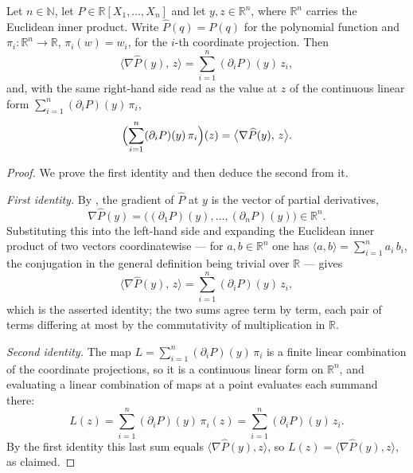 \begin{lemma}
Let $n\in\mathbb{N}$, let $P\in\mathbb{R}[X_1,\dots,X_n]$ and let
$y,z\in\mathbb{R}^n$, where $\mathbb{R}^n$ carries the Euclidean inner product.
Write $\widehat{P}(q)=P(q)$ for the polynomial function and $\pi_i\colon
\mathbb{R}^n\to\mathbb{R}$, $\pi_i(w)=w_i$, for the $i$-th coordinate
projection. Then
\[
  \bigl\langle\nabla\widehat{P}(y),\,z\bigr\rangle
    =\sum_{i=1}^{n}(\partial_iP)(y)\,z_i ,
\]
and, with the same right-hand side read as the value at $z$ of the continuous
linear form $\sum_{i=1}^{n}(\partial_iP)(y)\,\pi_i$,
\[
  \Bigl(\sum_{i=1}^{n}(\partial_iP)(y)\,\pi_i\Bigr)(z)
    =\bigl\langle\nabla\widehat{P}(y),\,z\bigr\rangle .
\]
\end{lemma}
\begin{proof}
We prove the first identity and then deduce the second from it.

\emph{First identity.} By , the gradient of
$\widehat{P}$ at $y$ is the vector of partial derivatives,
\[
  \nabla\widehat{P}(y)=\bigl((\partial_1P)(y),\dots,(\partial_nP)(y)\bigr)
    \in\mathbb{R}^n .
\]
Substituting this into the left-hand side and expanding the Euclidean inner
product of two vectors coordinatewise --- for $a,b\in\mathbb{R}^n$ one has
$\langle a,b\rangle=\sum_{i=1}^{n}a_i\,b_i$, the conjugation in the general
definition being trivial over $\mathbb{R}$ --- gives
\[
  \bigl\langle\nabla\widehat{P}(y),\,z\bigr\rangle
    =\sum_{i=1}^{n}(\partial_iP)(y)\,z_i ,
\]
which is the asserted identity; the two sums agree term by term, each pair of
terms differing at most by the commutativity of multiplication in $\mathbb{R}$.

\emph{Second identity.} The map $L=\sum_{i=1}^{n}(\partial_iP)(y)\,\pi_i$ is a
finite linear combination of the coordinate projections, so it is a continuous
linear form on $\mathbb{R}^n$, and evaluating a linear combination of maps at a
point evaluates each summand there:
\[
  L(z)=\sum_{i=1}^{n}(\partial_iP)(y)\,\pi_i(z)
    =\sum_{i=1}^{n}(\partial_iP)(y)\,z_i .
\]
By the first identity this last sum equals
$\langle\nabla\widehat{P}(y),z\rangle$, so
$L(z)=\langle\nabla\widehat{P}(y),z\rangle$, as claimed.
\end{proof}
